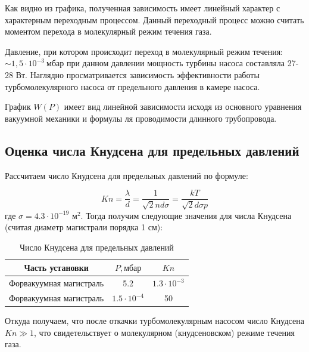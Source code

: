 \documentclass[a4paper, 12pt]{article}
\begin{document}
        Как видно из графика, полученная зависимость имеет линейный характер с характерным переходным процессом. Данный переходный процесс можно считать моментом перехода в молекулярный режим течения газа.
        
        Давление, при котором происходит переход в молекулярный режим течения: $\sim 1,5 \cdot 10^{-3} \: мбар$ при данном давлении мощность турбины насоса составляла 27-28 Вт. Наглядно просматривается зависимость эффективности работы турбомолекулярного насоса от предельного давления в камере насоса.

        График $W(P)$ имеет вид линейной зависимости исходя из основного уравнения вакуумной механики и формулы ля проводимости длинного трубопровода.
	
        \subsection*{Оценка числа Кнудсена для предельных давлений}
            Рассчитаем число Кнудсена для предельных давлений по формуле:
            
            \begin{equation}
                Kn=\frac{\lambda}{d}=\frac{1}{\sqrt{2}nd\sigma}=\frac{kT}{\sqrt{2}d\sigma p}
            \end{equation}
            где $\sigma = 4.3 \cdot 10^{-19} {\text{{ м}}^2}$. Тогда получим следующие значения для числа Кнудсена (считая диаметр магистрали порядка 1 см):

            \begin{table}[H]
                \label{кнудсен}
                \centering
                \begin{tabular}{|c|c|c|}
                \hline 
                Часть установки & $P, мбар$ & $Kn$  \\ 
                \hline 
                Форвакуумная магистраль &  5.2 & $1.3\cdot 10^{-3}$ \\ 
                \hline 
                Форвакуумная магистраль & $1.5 \cdot 10^{-4}$  & 50\\ 
                \hline
                \end{tabular} 
                \caption{Число Кнудсена для предельных давлений}
            \end{table}

            Откуда получаем, что после откачки турбомолекулярным насосом число Кнудсена $Kn\gg 1$, что свидетельствует о молекулярном (кнудсеновском) режиме течения газа.    
    
\end{document}
